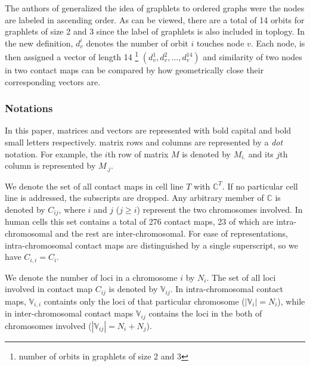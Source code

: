\documentclass[a4,center,fleqn]{NAR}
\begin{document}
The authors of \cite{di2010fast} generalized the idea of graphlets to 
ordered graphs were the nodes are labeled in ascending order.
As can be viewed, there are a total of 14 orbits for graphlets of size
2 and 3 since the label of graphlets is also included in toplogy.
In the new definition, $d_v^i$ denotes the number of orbit $i$ touches 
node $v$. Each node, is then assigned a vector of length 14 
\footnote{number of orbits in graphlets of size 2 and 3}
$(d_v^1, d_v^2, ..., d_v^{14})$ 
and similarity of two nodes in two contact maps can be compared by
how geometrically close their corresponding vectors are.

\subsubsection{Notations}
In this paper, matrices and vectors are represented with bold
capital and bold small letters respectively.
matrix rows and columns are represented by a \textit{dot}
notation. For example, the $i$th row of matrix $M$ is
denoted by $M_{i.}$ and its $j$th column is represented
by $M_{.j}$.

We denote the set of all contact maps in cell line $T$ with 
$\mathbb{C}^T$. If no particular cell line is addressed, the
subscripts are dropped.
Any arbitrary member of $\mathbb{C}$ is denoted by 
$C_{ij}$, where $i$ and $j$ ($j \ge i$) represent the two chromosomes involved. 
In human cells this set contains a total of 276 contact maps,
23 of which are intra-chromosomal and the rest are inter-chromosomal.
For ease of representations, intra-chromosomal contact maps are
distinguished by a single superscript, so we have $C_{i,i} =
C_i$.

We denote the number of loci in a chromosome $i$ by $N_i$.
The set of all loci involved in contact map $C_{ij}$ is denoted 
by $\mathbb{V}_{ij}$.
In intra-chromosomal contact maps, $\mathbb{V}_{i,i}$ containts only the 
loci of that particular chromosome ($|\mathbb{V}_i| = N_i$), while in 
inter-chromosomal contact maps $\mathbb{V}_{ij}$ contains the loci in
the both of chromosomes involved ($|\mathbb{V}_{ij}| = N_i + N_j$).

\enlargethispage{-65.1pt}
\end{document}
